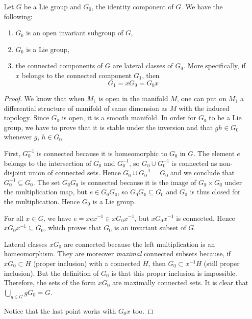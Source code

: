 \begin{proposition}		\label{PROPooWNJXooXhqKKv}
	Let $G$ be a Lie group and $G_0$, the identity component of $G$. We have the following:
	\begin{enumerate}
		\item $G_0$ is an open invariant subgroup of $G$,
		\item $G_0$ is a Lie group,
		\item the connected components of $G$ are lateral classes of $G_0$. More specifically, if $x$ belongs to the connected component $G_1$, then
		      \begin{equation}		\label{EQooKCPVooBBOcgT}
			      G_1=xG_0=G_0x
		      \end{equation}
	\end{enumerate}

\end{proposition}

\begin{proof}
	We know that when $M_{1}$ is open in the manifold $M$, one can put on $M_{1}$ a differential structure of manifold of same dimension as $M$ with the induced topology. Since $G_0$ is open, it is a smooth manifold. In order for $G_0$ to be a Lie group, we have to prove that it is stable under the inversion and that $gh\in G_0$ whenever $g$, $h\in G_0$.

	First, $G_0^{-1}$ is connected because  it is homeomorphic to $G_0$ in $G$. The element $e$ belongs to the intersection of $G_0$ and $G_0^{-1}$, so $G_0\cup G_0^{-1}$ is connected as non-disjoint union of connected sets. Hence $G_0\cup G_0^{-1}=G_0$ and we conclude that $G_0^{-1}\subseteq G_0$. The set $G_0G_0$ is connected because it is the image of $G_0\times G_0$ under the multiplication map, but $e\in G_0G_0$, so $G_0G_0\subseteq G_0$ and  $G_0$ is thus closed for the multiplication. Hence $G_0$ is a Lie group.

	For all $x\in G$, we have $e=xex^{-1}\in xG_0x^{-1}$, but $xG_0x^{-1}$ is connected. Hence $xG_0x^{-1}\subseteq G_0$, which proves that $G_0$ is an invariant subset of $G$.

	Lateral classes $xG_0$ are connected because the left multiplication is an homeomorphism. They are moreover \emph{maximal} connected subsets because, if $xG_0\subset H$ (proper inclusion) with a connected $H$, then $G_0\subset x^{-1}H$ (still proper inclusion). But the definition of $G_0$ is that this proper inclusion is impossible. Therefore, the sets of the form $xG_0$ are maximally connected sets. It is clear that $\bigcup_{g\in G}gG_0=G$.

	Notice that the last point works with $G_0x$ too.
\end{proof}

